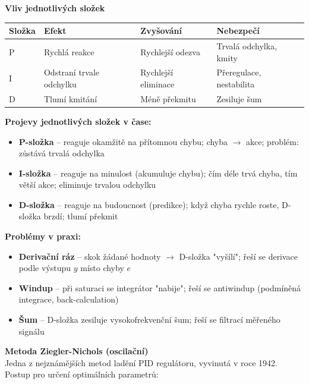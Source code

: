 \documentclass[a4paper,10pt]{article}
\begin{document}
\begin{vysvetlenibox}
\textbf{Vliv jednotlivých složek}

\begin{center}
\begin{tabularx}{0.95\linewidth}{@{} l X X X @{}}
    \toprule
    \textbf{Složka} & \textbf{Efekt} & \textbf{Zvyšování}
                    & \textbf{Nebezpečí} \\
    \midrule
    P & Rychlá reakce & Rychlejší odezva & Trvalá odchylka, kmity \\
    I & Odstraní trvale odchylku & Rychlejší eliminace & Přeregulace, nestabilita \\
    D & Tlumí kmitání & Méně překmitu & Zesiluje šum \\
    \bottomrule
\end{tabularx}
\end{center}

\textbf{Projevy jednotlivých složek v čase:}
\begin{itemize}[noitemsep, leftmargin=1.4em, topsep=4pt]
    \item \textbf{P-složka} -- reaguje okamžitě na přítomnou chybu;
          chyba $\to$ akce; problém: zůstává trvalá odchylka
    \item \textbf{I-složka} -- reaguje na minulost (akumuluje chybu);
          čím déle trvá chyba, tím větší akce; eliminuje trvalou odchylku
    \item \textbf{D-složka} -- reaguje na budoucnost (predikce);
          když chyba rychle roste, D-složka brzdí; tlumí překmit
\end{itemize}

\textbf{Problémy v praxi:}
\begin{itemize}[noitemsep, leftmargin=1.4em, topsep=4pt]
    \item \textbf{Derivační ráz} -- skok žádané hodnoty $\to$ D-složka "vyšílí";
          řeší se derivace podle výstupu $y$ místo chyby $e$
    \item \textbf{Windup} -- při saturaci se integrátor "nabije";
          řeší se antiwindup (podmíněná integrace, back-calculation)
    \item \textbf{Šum} -- D-složka zesiluje vysokofrekvenční šum;
          řeší se filtrací měřeného signálu
\end{itemize}

\textbf{Metoda Ziegler-Nichols (oscilační)}\\
Jedna z nejznámějších metod ladění PID regulátoru, vyvinutá v roce 1942.
Postup pro určení optimálních parametrů:


\end{vysvetlenibox}
\end{document}
